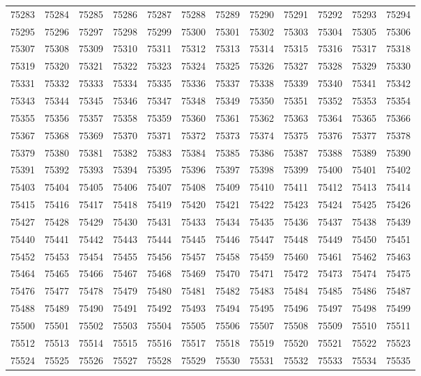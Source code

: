 \begin{center}
\begin{longtable}{llllllllllll}
75283 &75284 &75285 &75286 &75287 &75288 &75289 &75290 &75291 &75292 &75293 &75294 \\
75295 &75296 &75297 &75298 &75299 &75300 &75301 &75302 &75303 &75304 &75305 &75306 \\
75307 &75308 &75309 &75310 &75311 &75312 &75313 &75314 &75315 &75316 &75317 &75318 \\
75319 &75320 &75321 &75322 &75323 &75324 &75325 &75326 &75327 &75328 &75329 &75330 \\
75331 &75332 &75333 &75334 &75335 &75336 &75337 &75338 &75339 &75340 &75341 &75342 \\
75343 &75344 &75345 &75346 &75347 &75348 &75349 &75350 &75351 &75352 &75353 &75354 \\
75355 &75356 &75357 &75358 &75359 &75360 &75361 &75362 &75363 &75364 &75365 &75366 \\
75367 &75368 &75369 &75370 &75371 &75372 &75373 &75374 &75375 &75376 &75377 &75378 \\
75379 &75380 &75381 &75382 &75383 &75384 &75385 &75386 &75387 &75388 &75389 &75390 \\
75391 &75392 &75393 &75394 &75395 &75396 &75397 &75398 &75399 &75400 &75401 &75402 \\
75403 &75404 &75405 &75406 &75407 &75408 &75409 &75410 &75411 &75412 &75413 &75414 \\
75415 &75416 &75417 &75418 &75419 &75420 &75421 &75422 &75423 &75424 &75425 &75426 \\
75427 &75428 &75429 &75430 &75431 &75433 &75434 &75435 &75436 &75437 &75438 &75439 \\
75440 &75441 &75442 &75443 &75444 &75445 &75446 &75447 &75448 &75449 &75450 &75451 \\
75452 &75453 &75454 &75455 &75456 &75457 &75458 &75459 &75460 &75461 &75462 &75463 \\
75464 &75465 &75466 &75467 &75468 &75469 &75470 &75471 &75472 &75473 &75474 &75475 \\
75476 &75477 &75478 &75479 &75480 &75481 &75482 &75483 &75484 &75485 &75486 &75487 \\
75488 &75489 &75490 &75491 &75492 &75493 &75494 &75495 &75496 &75497 &75498 &75499 \\
75500 &75501 &75502 &75503 &75504 &75505 &75506 &75507 &75508 &75509 &75510 &75511 \\
75512 &75513 &75514 &75515 &75516 &75517 &75518 &75519 &75520 &75521 &75522 &75523 \\
75524 &75525 &75526 &75527 &75528 &75529 &75530 &75531 &75532 &75533 &75534 &75535 \\

\end{longtable}
\end{center}
